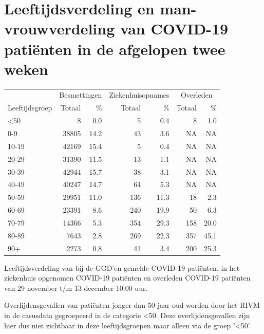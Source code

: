 \documentclass[
  english,
  man,floatsintext]{apa6}
\begin{document}
\hypertarget{leeftijdsverdeling-en-man-vrouwverdeling-van-covid-19-patiuxebnten-in-de-afgelopen-twee-weken}{%
\section{Leeftijdsverdeling en man-vrouwverdeling van COVID-19 patiënten in de afgelopen twee weken}\label{leeftijdsverdeling-en-man-vrouwverdeling-van-covid-19-patiuxebnten-in-de-afgelopen-twee-weken}}

\begin{table}
\centering\begingroup\fontsize{11}{13}\selectfont

\begin{threeparttable}
\begin{tabular}{lrrrrrr}
\toprule
\multicolumn{1}{c}{ } & \multicolumn{2}{c}{Besmettingen} & \multicolumn{2}{c}{Ziekenhuisopnames} & \multicolumn{2}{c}{Overleden} \\
\cmidrule(l{3pt}r{3pt}){2-3} \cmidrule(l{3pt}r{3pt}){4-5} \cmidrule(l{3pt}r{3pt}){6-7}
Leeftijdsgroep & Totaal & \% & Totaal & \% & Totaal & \%\\
\midrule
<50 & 8 & 0.0 & 5 & 0.4 & 8 & 1.0\\
0-9 & 38805 & 14.2 & 43 & 3.6 & NA & NA\\
10-19 & 42169 & 15.4 & 5 & 0.4 & NA & NA\\
20-29 & 31390 & 11.5 & 13 & 1.1 & NA & NA\\
30-39 & 42944 & 15.7 & 38 & 3.1 & NA & NA\\
40-49 & 40247 & 14.7 & 64 & 5.3 & NA & NA\\
50-59 & 29951 & 11.0 & 136 & 11.3 & 18 & 2.3\\
60-69 & 23391 & 8.6 & 240 & 19.9 & 50 & 6.3\\
70-79 & 14366 & 5.3 & 354 & 29.3 & 158 & 20.0\\
80-89 & 7643 & 2.8 & 269 & 22.3 & 357 & 45.1\\
90+ & 2273 & 0.8 & 41 & 3.4 & 200 & 25.3\\
\bottomrule
\end{tabular}
\begin{tablenotes}
\item[1] Leeftijdsverdeling van bij de GGD’en gemelde COVID-19 patiënten, in het ziekenhuis opgenomen COVID-19 patiënten en overleden COVID-19 patiënten van 29 november t/m 13 december 10:00 uur.
\item[2] Overlijdensgevallen van patiënten jonger dan 50 jaar oud worden door het RIVM in de casusdata gegroepeerd in de categorie <50. Deze overlijdensgevallen zijn hier dus niet zichtbaar in deze leeftijdsgroepen maar alleen via de groep '<50'.
\end{tablenotes}
\end{threeparttable}
\endgroup{}
\end{table}
\end{document}
